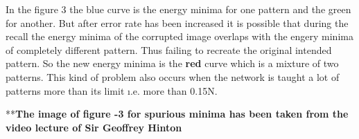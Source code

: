 \documentclass{article}
\begin{document}
In the figure 3 the blue curve is the energy minima for one pattern and the
green for another. But after error rate has been increased it is possible that
during the recall the energy minima of the corrupted image overlaps with the
engery minima of completely different pattern. Thus failing to recreate the
original intended pattern. So the new energy minima is the \textbf{red} curve
which is a mixture of two patterns. This kind of problem also occurs when the
network is taught a lot of patterns more than its limit \i.e. more than 0.15N. 


**\textbf{The image of figure -3 for spurious minima has been taken from the video lecture of Sir
Geoffrey Hinton}
\end{document}
